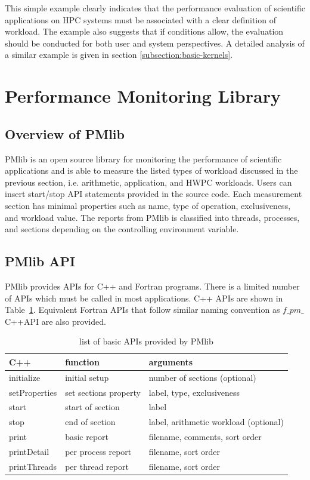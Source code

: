 \documentclass[conference]{IEEEtran}
\begin{document}
This simple example clearly indicates that the performance evaluation of
scientific applications on HPC systems must be associated with a clear
definition of workload. The example also suggests that if conditions allow, the evaluation should be
conducted for both user and system perspectives.
A detailed analysis of a similar example is given in section
\ref{subsection:basic-kernels}.

\section{Performance Monitoring Library}
\label{section:PMlib}

%
\subsection {Overview of PMlib}
PMlib is an open source library for monitoring the performance of scientific applications
and is able to measure the listed types of workload discussed
in the previous
section, i.e. arithmetic, application, and HWPC workloads.
Users can insert start/stop API statements provided in the source code.
Each measurement section has minimal properties such as name, type of operation,
exclusiveness, and workload value.
The reports from PMlib is classified into threads, processes, and sections
depending on the controlling environment variable.

%
\subsection{PMlib API}
PMlib provides APIs for C++ and Fortran programs.
There is a limited number of APIs which must be called in most applications.
C++ APIs are shown in Table~\ref{tab:PMlib-API}. 
Equivalent Fortran APIs that follow similar naming convention as
$f\_pm\_${\footnotesize{C++API}} are also provided.

\begin{table}[htb]
\scriptsize
\caption{list of basic APIs provided by PMlib}
\label{tab:PMlib-API}
\footnotesize
\begin{tabular}{l|l|l} \hline
\scriptsize
C++	& function	&	arguments	\\ \hline \hline
initialize	& initial setup	& number of sections (optional)	\\ %
setProperties	& set sections property	& label, type, exclusiveness \\ %
start	& start of section	& label \\ %
stop	& end of section	& label, arithmetic workload (optional)	\\ %
print	& basic report	& filename, comments, sort order	\\ %
printDetail	& per process report	& filename, sort order	\\ %
printThreads	& per thread report	& filename, sort order	\\ \hline
\end{tabular}
\end{table}
\end{document}
